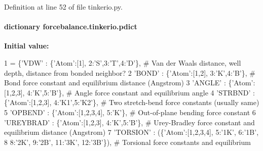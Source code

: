 Definition at line 52 of file tinkerio.\-py.

\hypertarget{namespaceforcebalance_1_1tinkerio_a714d1b926359d7d11559720e422ec34d}{
\paragraph[{pdict}]{\setlength{\rightskip}{0pt plus 5cm}dictionary forcebalance.\-tinkerio.\-pdict}}\label{namespaceforcebalance_1_1tinkerio_a714d1b926359d7d11559720e422ec34d}
{\bfseries Initial value\-:}
\begin{DoxyCode}
1 = \{\textcolor{stringliteral}{'VDW'}          : \{\textcolor{stringliteral}{'Atom'}:[1], 2:\textcolor{stringliteral}{'S'},3:\textcolor{stringliteral}{'T'},4:\textcolor{stringliteral}{'D'}\}, \textcolor{comment}{# Van der Waals distance, well depth, distance from
       bonded neighbor?}
2          \textcolor{stringliteral}{'BOND'}         : \{\textcolor{stringliteral}{'Atom'}:[1,2], 3:\textcolor{stringliteral}{'K'},4:\textcolor{stringliteral}{'B'}\},     \textcolor{comment}{# Bond force constant and equilibrium distance
       (Angstrom)}
3          \textcolor{stringliteral}{'ANGLE'}        : \{\textcolor{stringliteral}{'Atom'}:[1,2,3], 4:\textcolor{stringliteral}{'K'},5:\textcolor{stringliteral}{'B'}\},   \textcolor{comment}{# Angle force constant and equilibrium angle}
4          \textcolor{stringliteral}{'STRBND'}       : \{\textcolor{stringliteral}{'Atom'}:[1,2,3], 4:\textcolor{stringliteral}{'K1'},5:\textcolor{stringliteral}{'K2'}\}, \textcolor{comment}{# Two stretch-bend force constants (usually
       same)}
5          \textcolor{stringliteral}{'OPBEND'}       : \{\textcolor{stringliteral}{'Atom'}:[1,2,3,4], 5:\textcolor{stringliteral}{'K'}\},       \textcolor{comment}{# Out-of-plane bending force constant}
6          \textcolor{stringliteral}{'UREYBRAD'}     : \{\textcolor{stringliteral}{'Atom'}:[1,2,3], 4:\textcolor{stringliteral}{'K'},5:\textcolor{stringliteral}{'B'}\},   \textcolor{comment}{# Urey-Bradley force constant and equilibrium
       distance (Angstrom)}
7          \textcolor{stringliteral}{'TORSION'}      : (\{\textcolor{stringliteral}{'Atom'}:[1,2,3,4], 5:\textcolor{stringliteral}{'1K'}, 6:\textcolor{stringliteral}{'1B'}, 
8                             8:\textcolor{stringliteral}{'2K'}, 9:\textcolor{stringliteral}{'2B'}, 11:\textcolor{stringliteral}{'3K'}, 12:\textcolor{stringliteral}{'3B'}\}), \textcolor{comment}{# Torsional force constants and equilibrium
}
\end{DoxyCode}
